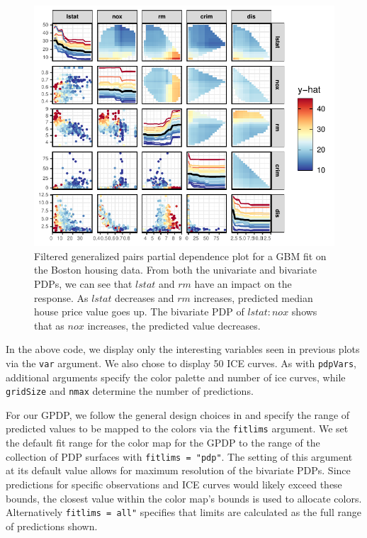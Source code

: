 \begin{figure}

{\centering \includegraphics[width=0.75\linewidth]{vivid_files/figure-latex/gpdp-1} 

}

\caption{Filtered generalized pairs partial dependence plot for a GBM fit on the Boston housing data. From both the univariate and bivariate PDPs, we can see that $lstat$ and $rm$ have an impact on the response. As $lstat$ decreases and $rm$ increases, predicted median house price value goes up. The bivariate PDP of $lstat:nox$ shows that as $nox$ increases, the predicted value decreases.}\label{fig:gpdp}
\end{figure}

In the above code, we display only the interesting variables seen in previous plots via the \texttt{var} argument. We also chose to display 50 ICE curves. As with \texttt{pdpVars}, additional arguments specify the color palette and number of ice curves, while \texttt{gridSize} and \texttt{nmax} determine the number of predictions.

For our GPDP, we follow the general design choices in  and specify the range of predicted values to be mapped to the colors via the \texttt{fitlims} argument. We set the default fit range for the color map for the GPDP to the range of the collection of PDP surfaces with \texttt{fitlims\ =\ "pdp"}. The setting of this argument at its default value allows for maximum resolution of the bivariate PDPs. Since predictions for specific observations and ICE curves would likely exceed these bounds, the closest value within the color map's bounds is used to allocate colors. Alternatively \texttt{fitlims\ =\ \textquotesingle{}all"} specifies that limits are calculated as the full range of predictions shown.

